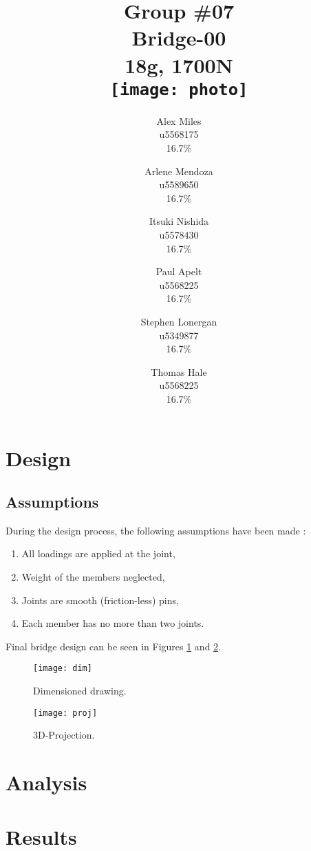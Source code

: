 \documentclass[12pt]{article}
\title{
		Group \#07 \\
		Bridge-00 \\
		18g, 1700N \\[1cm]
		\texttt{[image: photo]}
	}
\author{
		Alex Miles \\ u5568175 \\ 16.7\%
		\and Arlene Mendoza \\ u5589650 \\ 16.7\%
		\and Itsuki Nishida \\ u5578430 \\ 16.7\%
		\and Paul Apelt \\ u5568225 \\ 16.7\%
		\and Stephen Lonergan \\ u5349877 \\ 16.7\%
		\and Thomas Hale \\ u5568225 \\ 16.7\%
	}
\begin{document}
	\maketitle
	\section{Design}
		\subsection{Assumptions}
		During the design process, the following assumptions have been made \citep[p.~264]{tbook}:
		\begin{enumerate}
			\item All loadings are applied at the joint,
			\item Weight of the members neglected,
			\item Joints are smooth (friction-less) pins,
			\item Each member has no more than two joints.
		\end{enumerate}
		Final bridge design can be seen in Figures \ref{dim} and \ref{proj}.
		\begin{figure}[h!]
			\centering
			\texttt{[image: dim]}
			\caption{Dimensioned drawing.}
			\label{dim}
		\end{figure}
		\begin{figure}[h!]
			\centering
			\texttt{[image: proj]}
			\caption{3D-Projection.}
			\label{proj}
		\end{figure}
	\section{Analysis}
	\section{Results}
	
\end{document}
